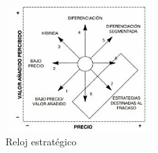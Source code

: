 \documentclass[12pt]{article}
\theoremstyle{definition_wo_parentheses}
\begin{document}
\begin{figure}[H]
 \centering
 \includegraphics[width=0.5\textwidth]{relojEstrategico}
 \caption{Reloj estratégico}
\end{figure}
\end{document}
